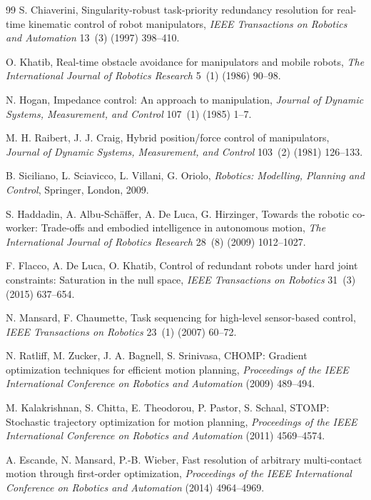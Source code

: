 \documentclass[preprint,12pt]{elsarticle}
\begin{document}
\begin{thebibliography}{99}
S. Chiaverini,
Singularity-robust task-priority redundancy resolution for real-time kinematic control of robot manipulators,
\textit{IEEE Transactions on Robotics and Automation} 13~(3) (1997) 398--410.

O. Khatib,
Real-time obstacle avoidance for manipulators and mobile robots,
\textit{The International Journal of Robotics Research} 5~(1) (1986) 90--98.

N. Hogan,
Impedance control: An approach to manipulation,
\textit{Journal of Dynamic Systems, Measurement, and Control} 107~(1) (1985) 1--7.

M. H. Raibert, J. J. Craig,
Hybrid position/force control of manipulators,
\textit{Journal of Dynamic Systems, Measurement, and Control} 103~(2) (1981) 126--133.

B. Siciliano, L. Sciavicco, L. Villani, G. Oriolo,
\textit{Robotics: Modelling, Planning and Control},
Springer, London, 2009.

S. Haddadin, A. Albu-Schäffer, A. De Luca, G. Hirzinger,
Towards the robotic co-worker: Trade-offs and embodied intelligence in autonomous motion,
\textit{The International Journal of Robotics Research} 28~(8) (2009) 1012--1027.

F. Flacco, A. De Luca, O. Khatib,
Control of redundant robots under hard joint constraints: Saturation in the null space,
\textit{IEEE Transactions on Robotics} 31~(3) (2015) 637--654.

N. Mansard, F. Chaumette,
Task sequencing for high-level sensor-based control,
\textit{IEEE Transactions on Robotics} 23~(1) (2007) 60--72.

N. Ratliff, M. Zucker, J. A. Bagnell, S. Srinivasa,
CHOMP: Gradient optimization techniques for efficient motion planning,
\textit{Proceedings of the IEEE International Conference on Robotics and Automation} (2009) 489--494.

M. Kalakrishnan, S. Chitta, E. Theodorou, P. Pastor, S. Schaal,
STOMP: Stochastic trajectory optimization for motion planning,
\textit{Proceedings of the IEEE International Conference on Robotics and Automation} (2011) 4569--4574.

A. Escande, N. Mansard, P.-B. Wieber,
Fast resolution of arbitrary multi-contact motion through first-order optimization,
\textit{Proceedings of the IEEE International Conference on Robotics and Automation} (2014) 4964--4969.


\end{thebibliography}
\end{document}
